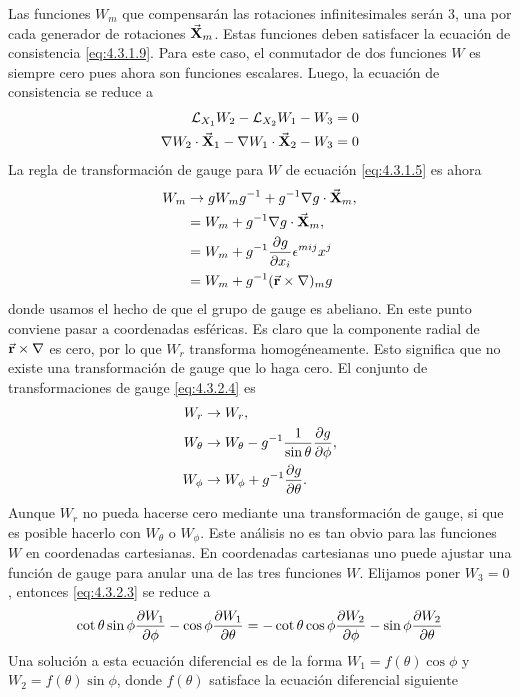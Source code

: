Las funciones $W_m$ que compensarán las rotaciones infinitesimales serán 3, una por cada generador de rotaciones $\vec{\mathbf{X}}_m$. Estas funciones deben satisfacer la ecuación de consistencia \eqref{eq:4.3.1.9}. Para este caso, el conmutador de dos funciones  $W$ es siempre cero pues ahora son funciones escalares. Luego, la ecuación de consistencia se reduce a
\begin{align}\nonumber
	\mathcal{L}_{X_1}W_2-\mathcal{L}_{X_2}W_1-W_3 &=0\\
	\nabla W_2\cdot\vec{\mathbf{X}}_1-\nabla W_1\cdot\vec{\mathbf{X}}_2-W_3 &=0 \label{eq:4.3.2.3}
\end{align}
La regla de transformación de gauge para $W$ de ecuación \eqref{eq:4.3.1.5} es ahora
\begin{align}\nonumber
	W_m&\rightarrow gW_m g^{-1}+g^{-1}\nabla g\cdot\vec{\mathbf{X}}_m,\\ \nonumber
	&= W_m+g^{-1}\nabla g\cdot\vec{\mathbf{X}}_m,\\ \nonumber
	&= W_m+g^{-1}\frac{\partial g}{\partial x_i}\epsilon^{mij}x^j\\
	&= W_m+g^{-1}(\vec{\mathbf{r}}\times\nabla)_m g \label{eq:4.3.2.4}
\end{align}
donde usamos el hecho de que el grupo de gauge es abeliano. En este punto conviene pasar a coordenadas esféricas. Es claro que la componente radial de $\vec{\mathbf{r}}\times\nabla$ es cero, por lo que $W_r$ transforma homogéneamente. Esto significa que no existe una transformación de gauge que lo haga cero. El conjunto de transformaciones de gauge \eqref{eq:4.3.2.4} es
\begin{align}
	W_r &\rightarrow W_r,\\
	W_\theta &\rightarrow W_\theta-g^{-1}\frac{1}{\sin\theta}\frac{\partial g}{\partial\phi},\\
	W_\phi &\rightarrow W_\phi+g^{-1}\frac{\partial g}{\partial\theta}.
\end{align}
Aunque $W_r$ no pueda hacerse cero mediante una transformación de gauge, si que es posible hacerlo con $W_\theta$ o $W_\phi$. Este análisis no es tan obvio para las funciones $W$ en coordenadas cartesianas. En coordenadas cartesianas uno puede ajustar una función de gauge para anular una de las tres funciones $W$. Elijamos poner $W_3=0$, entonces \eqref{eq:4.3.2.3} se reduce a
\begin{align}
	\cot\theta\sin\phi\frac{\partial W_1}{\partial\phi}-\cos\phi\frac{\partial W_1}{\partial\theta} = -\cot\theta\cos\phi\frac{\partial W_2}{\partial\phi}-\sin\phi\frac{\partial W_2}{\partial\theta}
\end{align}
Una solución a esta ecuación diferencial es de la forma $W_1=f(\theta)\cos\phi$ y $W_2=f(\theta)\sin\phi$, donde $f(\theta)$ satisface la ecuación diferencial siguiente
